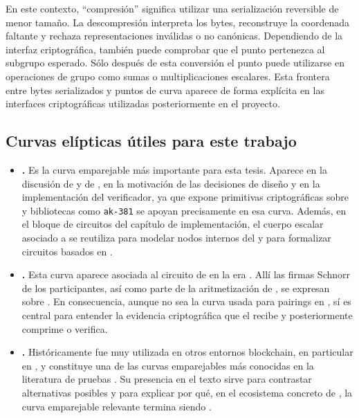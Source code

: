 En este contexto, ``compresión'' significa utilizar una serialización reversible de menor tamaño. La descompresión interpreta los bytes, reconstruye la coordenada faltante y rechaza representaciones inválidas o no canónicas. Dependiendo de la interfaz criptográfica, también puede comprobar que el punto pertenezca al subgrupo esperado. Sólo después de esta conversión el punto puede utilizarse en operaciones de grupo como sumas o multiplicaciones escalares. Esta frontera entre bytes serializados y puntos de curva aparece de forma explícita en las interfaces criptográficas utilizadas posteriormente en el proyecto.

\subsection{Curvas elípticas útiles para este trabajo}
\label{subsec:apendice-a-curvas-elipticas-curvas-elipticas-utiles-para-este-trabajo}

\begin{itemize}[noitemsep]
	\item \textbf{\BLS.} Es la curva emparejable más importante para esta tesis. Aparece en la discusión de \Groth y de \KZG, en la motivación de las decisiones de diseño y en la implementación \Onchain del verificador, ya que \Cardano expone primitivas criptográficas sobre \BLS \cite{CIP0381} y bibliotecas como \texttt{ak-381} se apoyan precisamente en esa curva. Además, en el bloque de circuitos del capítulo de implementación, el cuerpo escalar asociado a \BLS se reutiliza para modelar nodos internos del \SMT y para formalizar circuitos basados en \PoseidonHash.
	\item \textbf{\Jubjub.} Esta curva aparece asociada al circuito \STM de \Mithril en la era \Lagrange. Allí las firmas Schnorr de los participantes, así como parte de la aritmetización de \HaloTwo, se expresan sobre \Jubjub. En consecuencia, aunque \Jubjub no sea la curva usada para pairings \Onchain en \Cardano, sí es central para entender la evidencia criptográfica que el \zkBridge recibe y posteriormente comprime o verifica.
	\item \textbf{\BN.} Históricamente fue muy utilizada en otros entornos blockchain, en particular en \Ethereum, y constituye una de las curvas emparejables más conocidas en la literatura de pruebas \zkSNARK. Su presencia en el texto sirve para contrastar alternativas posibles y para explicar por qué, en el ecosistema concreto de \Cardano, la curva emparejable relevante termina siendo \BLS.
\end{itemize}
